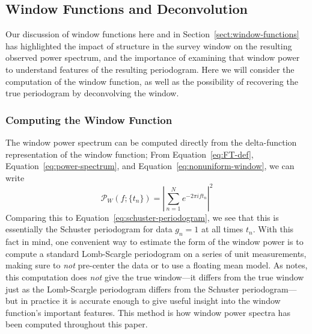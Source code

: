 \documentclass[preprint]{aastex}
\newcommand{\Eq}[1]{Equation~\ref{eq:#1}}
\newcommand{\eq}[1]{\Eq{#1}}
\newcommand{\eqlabel}[1]{\label{eq:#1}}
\newcommand{\Sect}[1]{Section~\ref{sect:#1}}
\newcommand{\sect}[1]{\Sect{#1}}
\newcommand{\sectlabel}[1]{\label{sect:#1}}
\begin{document}
\subsection{Window Functions and Deconvolution}
\sectlabel{windows-and-deconvolution}

Our discussion of window functions here and in \sect{window-functions}
has highlighted the impact of structure in the survey window on the
resulting observed power spectrum, and the importance of examining that
window power to understand features of the resulting periodogram.
Here we will consider the computation of the window function, as well
as the possibility of recovering the true periodogram by deconvolving
the window.

\subsubsection{Computing the Window Function}
\sectlabel{computing-window-function}
The window power spectrum can be computed directly from the
delta-function representation of the window function;
From \eq{FT-def}, \eq{power-spectrum}, and \eq{nonuniform-window},
we can write
\begin{equation}
  \mathcal{P}_W(f;\{t_n\}) = \left|\sum_{n=1}^{N} e^{-2\pi i f t_n}\right|^2
  \eqlabel{window-power-analytic}
\end{equation}
Comparing this to \eq{schuster-periodogram}, we see that this is essentially
the Schuster periodogram for data $g_n=1$ at all times $t_n$.
With this fact in mind, one convenient way to estimate the form of the
window power is to compute a standard Lomb-Scargle periodogram on a series of
unit measurements, making sure to {\it not} pre-center the data or to use a
floating mean model.
As \citet{Scargle82} notes, this computation does {\it not} give the true
window---it differs
from the true window just as the Lomb-Scargle periodogram differs from the
Schuster periodogram---but in practice it is accurate enough to give
useful insight into the window function's important features.
This method is how window power spectra has been computed throughout this
paper.
\end{document}
